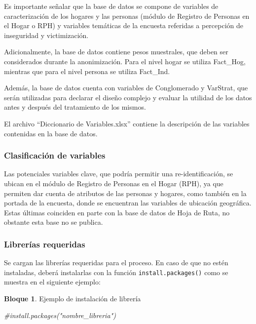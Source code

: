 \documentclass[]{book}
\newenvironment{Shaded}{\begin{snugshade}}{\end{snugshade}}
\newcommand{\CommentTok}[1]{\textcolor[rgb]{0.56,0.35,0.01}{\textit{#1}}}
\theoremstyle{definition}
\theoremstyle{definition}
\newtheorem{example}{Bloque}[chapter]
\theoremstyle{definition}
\theoremstyle{definition}
\theoremstyle{remark}
\begin{document}
Es importante señalar que la base de datos se compone de variables de caracterización de los hogares y las personas (módulo de Registro de Personas en el Hogar o RPH) y variables temáticas de la encuesta referidas a percepción de inseguridad y victimización.

Adicionalmente, la base de datos contiene pesos muestrales, que deben ser considerados durante la anonimización. Para el nivel hogar se utiliza Fact\_Hog, mientras que para el nivel persona se utiliza Fact\_Ind.

Además, la base de datos cuenta con variables de Conglomerado y VarStrat, que serán utilizadas para declarar el diseño complejo y evaluar la utilidad de los datos antes y después del tratamiento de los mismos.

El archivo ``Diccionario de Variables.xlsx'' contiene la descripción de las variables contenidas en la base de datos.

\hypertarget{clasificaciuxf3n-de-variables-1}{%
\subsubsection{Clasificación de variables}\label{clasificaciuxf3n-de-variables-1}}

Las potenciales variables clave, que podría permitir una re-identificación, se ubican en el módulo de Registro de Personas en el Hogar (RPH), ya que permiten dar cuenta de atributos de las personas y hogares, como también en la portada de la encuesta, donde se encuentran las variables de ubicación geográfica. Estas últimas coinciden en parte con la base de datos de Hoja de Ruta, no obstante esta base no se publica.

\hypertarget{libreruxedas-requeridas}{%
\subsubsection{Librerías requeridas}\label{libreruxedas-requeridas}}

Se cargan las librerías requeridas para el proceso. En caso de que no estén instaladas, deberá instalarlas con la función \texttt{install.packages()} como se muestra en el siguiente ejemplo:

\begin{example}
\protect\hypertarget{exm:bloque4nbm}{}{\label{exm:bloque4nbm} }Ejemplo de instalación de librería
\end{example}

\begin{Shaded}
\begin{Highlighting}[]
\CommentTok{#install.packages("nombre_libreria") }
\end{Highlighting}
\end{Shaded}
\end{document}

